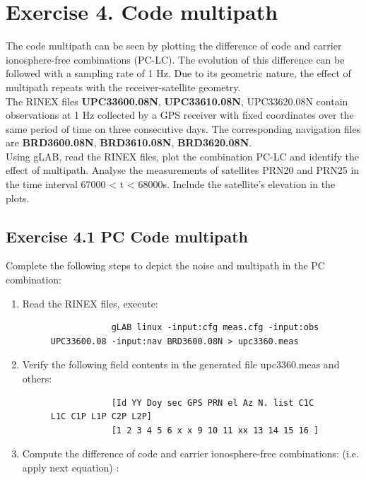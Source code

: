 \section{Exercise 4. Code multipath}
The code multipath can be seen by plotting the difference of code and carrier
ionosphere-free combinations (PC-LC). The evolution of this difference can be
followed with a sampling rate of 1 Hz. Due to its geometric nature, the effect
of multipath repeats with the receiver-satellite geometry.\\

The RINEX files \textbf{UPC33600.08N}, \textbf{UPC33610.08N}, UPC33620.08N contain
observations at 1 Hz collected by a GPS receiver with fixed coordinates over
the same period of time on three consecutive days. The corresponding
navigation files are \textbf{BRD3600.08N}, \textbf{BRD3610.08N}, \textbf{BRD3620.08N}.\\

Using gLAB, read the RINEX files, plot the combination PC-LC and identify
the effect of multipath. Analyse the measurements of satellites PRN20 and
PRN25 in the time interval 67000 < t < 68000s. Include the satellite's
elevation in the plots.\\

\subsection{Exercise 4.1 PC Code multipath}
Complete the following steps to depict the noise and multipath in the PC combination:
\begin{enumerate}
        \item Read the RINEX files, execute:
        \begin{figure}[H]
            \centering
            \begin{verbatim}
            gLAB linux -input:cfg meas.cfg -input:obs UPC33600.08 -input:nav BRD3600.08N > upc3360.meas 
            \end{verbatim}
            \caption{}
            \label{}
        \end{figure}
        
        \item Verify the following field contents in the generated file upc3360.meas and others:
        
        \begin{figure}[H]
            \centering
            \begin{verbatim}
            [Id YY Doy sec GPS PRN el Az N. list C1C L1C C1P L1P C2P L2P]
            [1 2 3 4 5 6 x x 9 10 11 xx 13 14 15 16 ]
            \end{verbatim}
            \caption{}
            \label{}
        \end{figure}

                
        \item Compute the difference of code and carrier ionosphere-free combinations: (i.e. apply next equation) :
\end{enumerate}
    



